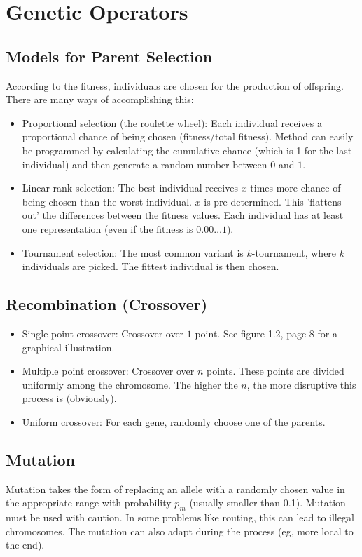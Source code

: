 \documentclass[12pt]{book}
\begin{document}
\section{Genetic Operators}
\subsection{Models for Parent Selection}
According to the fitness, individuals are chosen for the production of offspring. There are many ways of accomplishing this:
\begin{itemize}
\item Proportional selection (the roulette wheel): Each individual receives a proportional chance of being chosen (fitness/total fitness). Method can easily be programmed by calculating the cumulative chance (which is 1 for the last individual) and then generate a random number between $0$ and $1$.
\item Linear-rank selection: The best individual receives $x$ times more chance of being chosen than the worst individual. $x$ is pre-determined. This 'flattens out' the differences between the fitness values. Each individual has at least one representation (even if the fitness is $0.00\dots1$).
\item Tournament selection: The most common variant is $k$-tournament, where $k$ individuals are picked. The fittest individual is then chosen.
\end{itemize}
\subsection{Recombination (Crossover)}
\begin{itemize}
\item Single point crossover: Crossover over $1$ point. See figure 1.2, page 8 for a graphical illustration.
\item Multiple point crossover: Crossover over $n$ points. These points are divided uniformly among the chromosome. The higher the $n$, the more disruptive this process is (obviously).
\item Uniform crossover: For each gene, randomly choose one of the parents.
\end{itemize}
\subsection{Mutation}
Mutation takes the form of replacing an allele with a randomly chosen value in the appropriate range with probability $p_m$ (usually smaller than 0.1). Mutation must be used with caution. In some problems like routing, this can lead to illegal chromosomes. The mutation can also adapt during the process (eg, more local to the end).
\end{document}
